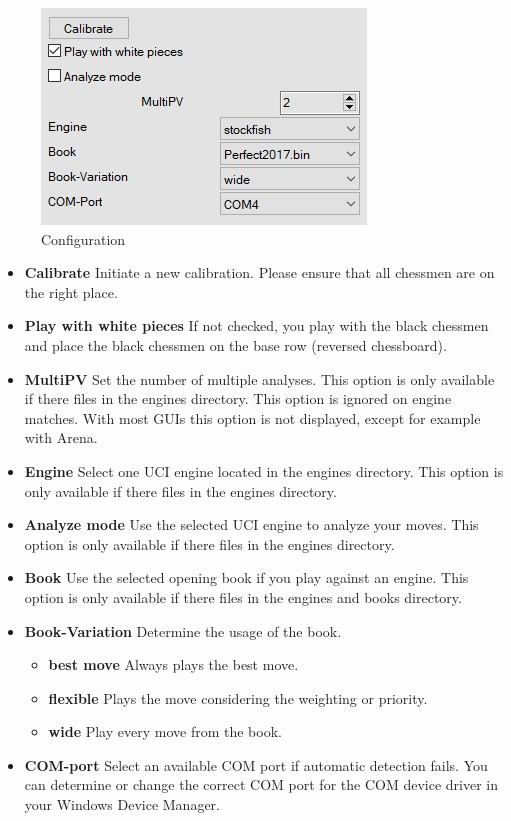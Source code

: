 \documentclass[11pt,a4paper]{article}
\begin{document}
\begin{figure}[H]
	\centering
	\includegraphics[scale=0.8]{configuration.jpg}
	\caption{Configuration}
	\label{fig:configration}
\end{figure}
\begin{itemize}
	\item \textbf{Calibrate} Initiate a new calibration. Please ensure that all chessmen are on the right place.
	\item \textbf{Play with white pieces} If not checked, you play with the black chessmen and place the black chessmen on the base row (reversed chessboard).

	\item \textbf{MultiPV} Set the number of multiple analyses. This option is only available if there files in the engines directory. This option is ignored on engine matches. With most GUIs this option is not displayed, except for example with Arena.
	
	\item \textbf{Engine} Select one UCI engine located in the engines directory. This option is only available if there files in the engines directory.

    \item \textbf{Analyze mode} Use the selected UCI engine to analyze your moves. This option is only available if there files in the engines directory.
    \item \textbf{Book} Use the selected opening book if you play against an engine. This option is only available if there files in the engines and books directory.
   \item \textbf{Book-Variation} Determine the usage of the book.
   \begin{itemize}
   	  \item \textbf{best move} Always plays the best move.
   	  \item \textbf{flexible} Plays the move considering the weighting or priority.
   	  \item \textbf{wide} Play every move from the book.
   \end{itemize}
    \item \textbf{COM-port} Select an available COM port if automatic detection fails. You can determine or change the correct COM port for the COM device driver in your Windows Device Manager.

\end{itemize}
\end{document}
